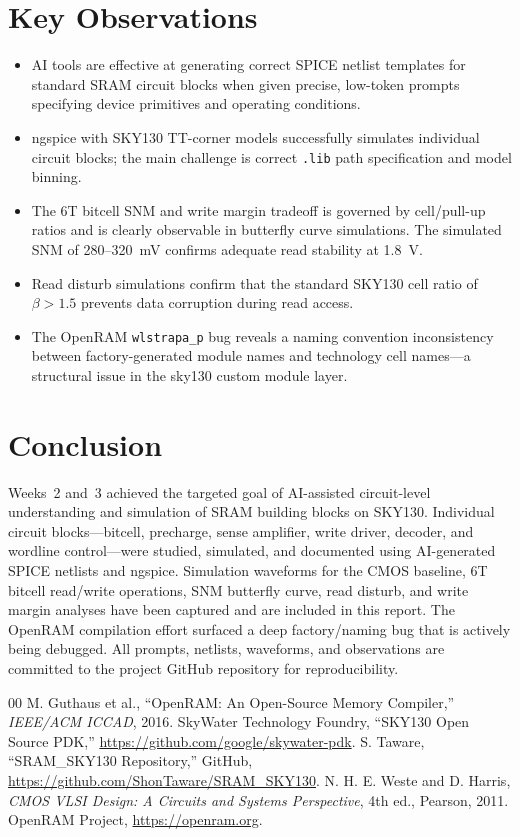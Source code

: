 \documentclass[conference]{IEEEtran}
\begin{document}
\section{Key Observations}
\begin{itemize}
    \item AI tools are effective at generating correct SPICE netlist templates for standard SRAM circuit blocks when given precise, low-token prompts specifying device primitives and operating conditions.
    \item ngspice with SKY130 TT-corner models successfully simulates individual circuit blocks; the main challenge is correct \texttt{.lib} path specification and model binning.
    \item The 6T bitcell SNM and write margin tradeoff is governed by cell/pull-up ratios and is clearly observable in butterfly curve simulations. The simulated SNM of 280--320~mV confirms adequate read stability at 1.8~V.
    \item Read disturb simulations confirm that the standard SKY130 cell ratio of $\beta > 1.5$ prevents data corruption during read access.
    \item The OpenRAM \texttt{wlstrapa\_p} bug reveals a naming convention inconsistency between factory-generated module names and technology cell names---a structural issue in the sky130 custom module layer.
\end{itemize}

\section{Conclusion}
Weeks~2 and~3 achieved the targeted goal of AI-assisted circuit-level understanding and simulation of SRAM building blocks on SKY130. Individual circuit blocks---bitcell, precharge, sense amplifier, write driver, decoder, and wordline control---were studied, simulated, and documented using AI-generated SPICE netlists and ngspice. Simulation waveforms for the CMOS baseline, 6T bitcell read/write operations, SNM butterfly curve, read disturb, and write margin analyses have been captured and are included in this report. The OpenRAM compilation effort surfaced a deep factory/naming bug that is actively being debugged. All prompts, netlists, waveforms, and observations are committed to the project GitHub repository for reproducibility.

\balance
\begin{thebibliography}{00}
 M. Guthaus et al., ``OpenRAM: An Open-Source Memory Compiler,'' \textit{IEEE/ACM ICCAD}, 2016.
 SkyWater Technology Foundry, ``SKY130 Open Source PDK,'' \url{https://github.com/google/skywater-pdk}.
 S. Taware, ``SRAM\_SKY130 Repository,'' GitHub, \url{https://github.com/ShonTaware/SRAM_SKY130}.
 N. H. E. Weste and D. Harris, \textit{CMOS VLSI Design: A Circuits and Systems Perspective}, 4th ed., Pearson, 2011.
 OpenRAM Project, \url{https://openram.org}.
\end{thebibliography}
\end{document}
